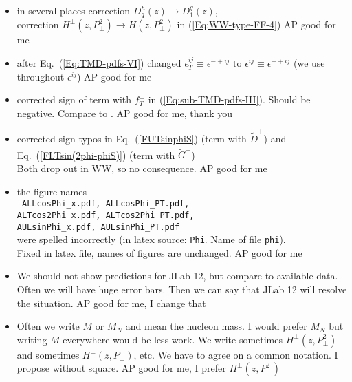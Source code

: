 \documentclass[a4paper,11pt]{article}
\def\pperp{P_\perp}
\begin{document}
\begin{itemize}
\item	in several places correction $D_q^h(z)\to D_1^q(z)$, \\
	correction $H^\perp(z,\pperp^2) \to H(z,\pperp^2)$
	in (\ref{Eq:WW-type-FF-4})  {\color{red} AP good for me}

\item	after Eq.~(\ref{Eq:TMD-pdfs-VI}) changed
	$\epsilon_T^{ij}\equiv\epsilon^{-+ij}$ to
	$\epsilon^{ij}\equiv\epsilon^{-+ij}$
	(we use throughout $\epsilon^{ij}$)  {\color{red} AP good for me}

\item 	corrected sign of term with $f_T^\perp$ in (\ref{Eq:sub-TMD-pdfs-III}). 
	Should be negative. Compare to \cite{Bacchetta:2006tn}.   {\color{red} AP good for me, thank you}

\item	corrected sign typos in 
	Eq.~(\ref{FUTsinphiS}) (term with $\tilde{D}^\perp$) and 
	Eq.~(\ref{FLTsin(2phi-phiS)}) (term with $\tilde{G}^\perp$)\\
	Both drop out in WW, so no consequence.  {\color{red} AP good for me}

\item 	the figure names \\ {\tt
	ALLcosPhi\_x.pdf, ALLcosPhi\_PT.pdf,  \\
  	ALTcos2Phi\_x.pdf, ALTcos2Phi\_PT.pdf, \\
  	AULsinPhi\_x.pdf, AULsinPhi\_PT.pdf} \\
	were spelled incorrectly (in latex source: {\tt Phi}. Name of file
	{\tt phi}).\\
	Fixed in latex file, names of figures are unchanged.  {\color{red} AP good for me}

\item	We should not show predictions for JLab 12,
	but compare to available data. Often we will have huge error bars.
	Then we can say that JLab 12 will resolve the situation.  {\color{red} AP good for me, I change that}

\item	Often we write $M$ or $M_N$ and mean the nucleon mass.
	I would prefer $M_N$ but writing $M$ everywhere would be less work.
	We write sometimes $H^\perp(z,\pperp^2)$ and sometimes
	$H^\perp(z,\pperp)$, etc. We have to agree on a common notation. 
	I propose without square.  {\color{red} AP good for me, I prefer $H^\perp(z,\pperp^2)$}


{}
\end{itemize}
\end{document}
